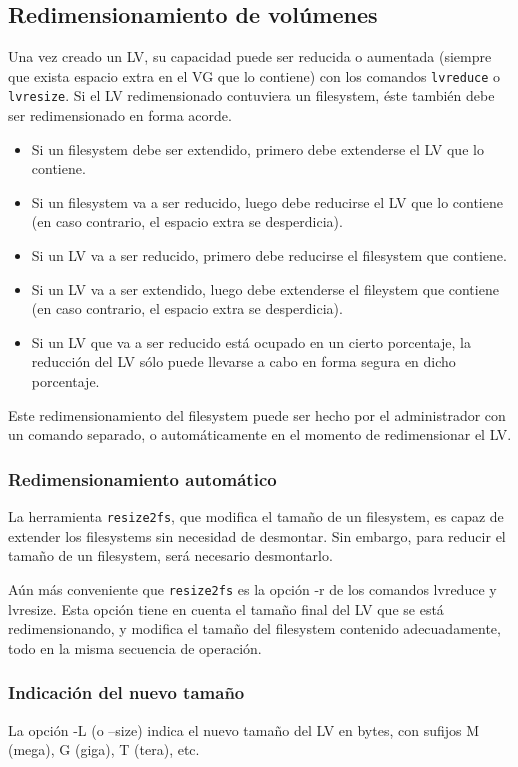 \subsection{Redimensionamiento de volúmenes}
\label{sub:redimVol}
Una vez creado un LV, su capacidad puede ser reducida o aumentada (siempre que exista espacio extra en el VG que lo contiene) con los comandos \lstinline$lvreduce$ o \lstinline$lvresize$. 
Si el LV redimensionado contuviera un filesystem, éste también debe ser redimensionado en forma acorde. 
\begin{itemize}
	\item Si un filesystem debe ser extendido, primero debe extenderse el LV que lo contiene. 
	\item Si un filesystem va a ser reducido, luego debe reducirse el LV que lo contiene (en caso contrario, el espacio extra se desperdicia). 
	\item Si un LV va a ser reducido, primero debe reducirse el filesystem que contiene.
	\item Si un LV va a ser extendido, luego debe extenderse el fileystem que contiene (en caso contrario, el espacio extra se desperdicia). 
	\item Si un LV que va a ser reducido está ocupado en un cierto porcentaje, la reducción del LV sólo puede llevarse a cabo en forma segura en dicho porcentaje. 
\end{itemize}

Este redimensionamiento del filesystem puede ser hecho por el administrador con un comando separado, o automáticamente en el momento de redimensionar el LV.

\subsubsection {Redimensionamiento automático}
La herramienta \lstinline$resize2fs$, que modifica el tamaño de un filesystem, es capaz de extender los filesystems sin necesidad de desmontar. Sin embargo, para reducir el tamaño de un filesystem, será necesario desmontarlo. 

Aún más conveniente que \lstinline$resize2fs$ es la opción -r de los comandos lvreduce y lvresize. Esta opción tiene en cuenta el tamaño final del LV que se está redimensionando, y modifica el tamaño del filesystem contenido adecuadamente, todo en la misma secuencia de operación. 

\subsubsection {Indicación del nuevo tamaño}
La opción -L (o --size) indica el nuevo tamaño del LV en bytes, con sufijos M (mega), G (giga), T (tera), etc.

